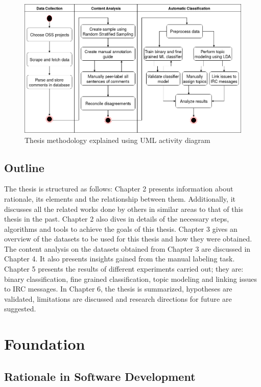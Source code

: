 \documentclass[a4paper,12pt,twoside]{report}
\begin{document}
\begin{figure}[h] %
    \centering
    \includegraphics[width=13cm]{methodology}
    \caption{Thesis methodology explained using UML activity diagram}
    \label{fig:thesisMethodology}
\end{figure}

\section{Outline}
The thesis is structured as follows: Chapter 2 presents information about rationale, its elements and the relationship between them. Additionally, it discusses all the related works done by others in similar areas to that of this thesis in the past. Chapter 2 also dives in details of the necessary steps, algorithms and tools to achieve the goals of this thesis. Chapter 3 gives an overview of the datasets to be used for this thesis and how they were obtained. The content analysis on the datasets obtained from Chapter 3 are discussed in Chapter 4. It also presents insights gained from the manual labeling task. Chapter 5 presents the results of different experiments carried out; they are: binary classification, fine grained classification, topic modeling and linking issues to IRC messages. In Chapter 6, the thesis is summarized, hypotheses are validated, limitations are discussed and research directions for future are suggested. 

\chapter{Foundation}

\section{Rationale in Software Development}
\end{document}
